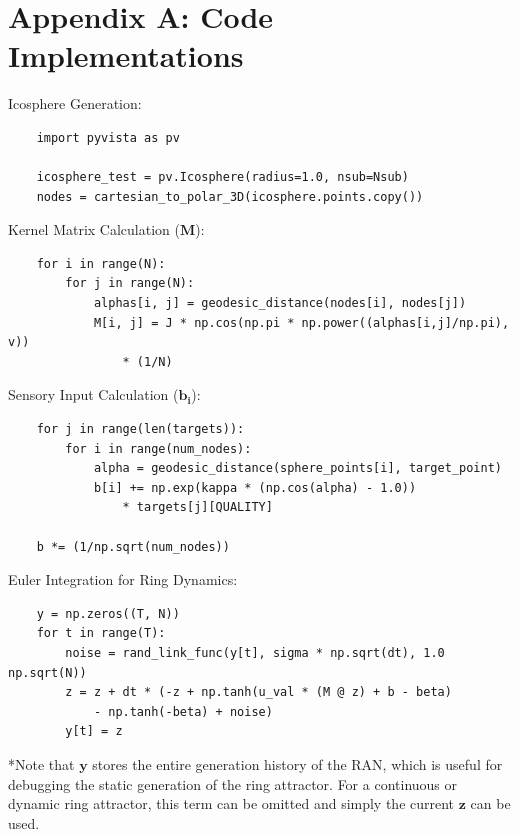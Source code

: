 \documentclass[12pt, letterpaper]{article}
\begin{document}
\section{Appendix A: Code Implementations}
\label{AppendixA}
Icosphere Generation: 
\begin{verbatim}
    import pyvista as pv
    
    icosphere_test = pv.Icosphere(radius=1.0, nsub=Nsub)
    nodes = cartesian_to_polar_3D(icosphere.points.copy())
\end{verbatim}

Kernel Matrix Calculation ($\mathbf{M}$): 
\begin{verbatim}
    for i in range(N):
        for j in range(N):           
            alphas[i, j] = geodesic_distance(nodes[i], nodes[j])
            M[i, j] = J * np.cos(np.pi * np.power((alphas[i,j]/np.pi), v)) 
                * (1/N)
\end{verbatim}


Sensory Input Calculation ($\mathbf{b_i}$):
\begin{verbatim}
    for j in range(len(targets)):
        for i in range(num_nodes):
            alpha = geodesic_distance(sphere_points[i], target_point)
            b[i] += np.exp(kappa * (np.cos(alpha) - 1.0)) 
                * targets[j][QUALITY]
    
    b *= (1/np.sqrt(num_nodes)) 
\end{verbatim}

Euler Integration for Ring Dynamics:
\begin{verbatim}
    y = np.zeros((T, N))
    for t in range(T):
        noise = rand_link_func(y[t], sigma * np.sqrt(dt), 1.0 np.sqrt(N))
        z = z + dt * (-z + np.tanh(u_val * (M @ z) + b - beta) 
            - np.tanh(-beta) + noise) 
        y[t] = z
\end{verbatim} 
*Note that $\mathbf{y}$ stores the entire generation history of the RAN, which is useful for debugging the static generation of the ring attractor. For a continuous or dynamic ring attractor, this term can be omitted and simply the current $\mathbf{z}$ can be used.

\end{document}
